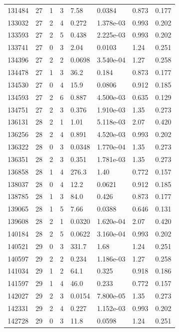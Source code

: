 \documentclass[preview]{standalone}
\begin{document}
{{{{{{{\begin{tabular}{L{1.2cm}C{1.2cm} C{0.3cm}C{0.5cm} C{1.4cm}C{1.4cm} C{1.4cm}C{1.4cm}}
  131484  &    27  & 1     &  3 &  7.58  & 0.0384  & 0.873 &  0.177   \\ 
  133032  &    27  & 2     &  4 &  0.272  & 1.378e-03  & 0.993 &  0.202   \\ 
  133593  &    27  & 2     &  5 &  0.438  & 2.225e-03  & 0.993 &  0.202   \\ 
  133741  &    27  & 0     &  3 &  2.04  & 0.0103  & 1.24 &  0.251   \\ 
  134396  &    27  & 2     &  2 &  0.0698  & 3.540e-04  & 1.27 &  0.258   \\ 
  134478  &    27  & 1     &  3 &  36.2  & 0.184  & 0.873 &  0.177   \\ 
  134530  &    27  & 0     &  4 &  15.9  & 0.0806  & 0.912 &  0.185   \\ 
  134593  &    27  & 2     &  6 &  0.887  & 4.500e-03  & 0.635 &  0.129   \\ 
  134751  &    27  & 2     &  3 &  0.376  & 1.910e-03  & 1.35 &  0.273   \\ 
  136131  &    28  & 2     &  1 &  1.01  & 5.118e-03  & 2.07 &  0.420   \\ 
  136256  &    28  & 2     &  4 &  0.891  & 4.520e-03  & 0.993 &  0.202   \\ 
  136322  &    28  & 0     &  3 &  0.0348  & 1.770e-04  & 1.35 &  0.273   \\ 
  136351  &    28  & 2     &  3 &  0.351  & 1.781e-03  & 1.35 &  0.273   \\ 
  136858  &    28  & 1     &  4 &  276.3  & 1.40  & 0.772 &  0.157   \\ 
  138037  &    28  & 0     &  4 &  12.2  & 0.0621  & 0.912 &  0.185   \\ 
  138785  &    28  & 1     &  3 &  84.0  & 0.426  & 0.873 &  0.177   \\ 
  139065  &    28  & 1     &  5 &  7.66  & 0.0388  & 0.646 &  0.131   \\ 
  139608  &    28  & 2     &  1 &  0.0320  & 1.620e-04  & 2.07 &  0.420   \\ 
  140184  &    28  & 2     &  5 &  0.0622  & 3.160e-04  & 0.993 &  0.202   \\ 
  140521  &    29  & 0     &  3 &  331.7  & 1.68  & 1.24 &  0.251   \\ 
  140597  &    29  & 2     &  2 &  0.234  & 1.186e-03  & 1.27 &  0.258   \\ 
  141034  &    29  & 1     &  2 &  64.1  & 0.325  & 0.918 &  0.186   \\ 
  141597  &    29  & 1     &  4 &  46.0  & 0.233  & 0.772 &  0.157   \\ 
  142027  &    29  & 2     &  3 &  0.0154  & 7.800e-05  & 1.35 &  0.273   \\ 
  142331  &    29  & 2     &  4 &  0.227  & 1.152e-03  & 0.993 &  0.202   \\ 
  142728  &    29  & 0     &  3 &  11.8  & 0.0598  & 1.24 &  0.251   \\ 
\hline 
\end{tabular} 

}}}}}}}
\end{document}
